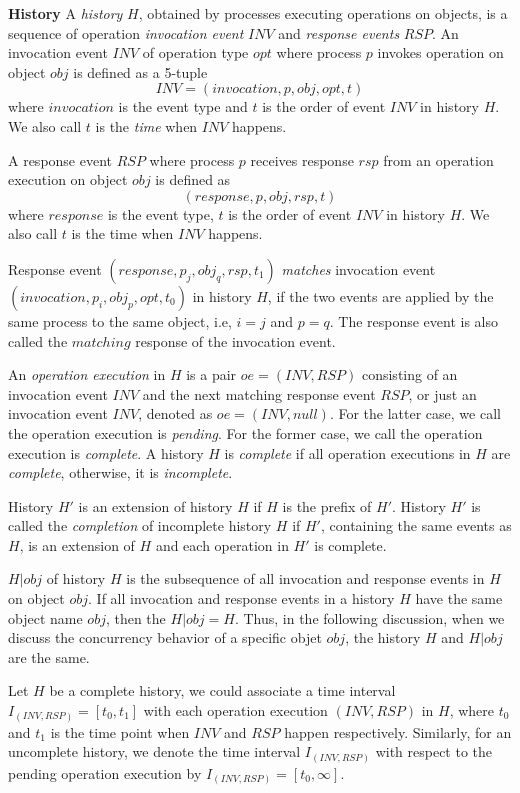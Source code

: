 \textbf{History}
A \emph{history} $H$, obtained by processes executing
operations on objects, is a sequence of operation \emph{invocation event} $INV$
and \emph{response events} $RSP$.
An invocation event $INV$ of operation type $opt$ where process $p$ invokes operation on object
$obj$ is defined as a 5-tuple
$$INV = (invocation, p, obj, opt, t)$$
where $invocation$ is the event type and
$t$ is the order of event $INV$ in history $H$. We also call $t$ is the \emph{time} when $INV$ happens.

A response event $RSP$ where process $p$ receives response $rsp$ from an operation execution on object $obj$
is defined as
$$(response, p, obj, rsp, t)$$
where $response$ is the event type, $t$ is the order of event $INV$
in history $H$. We also call $t$ is the time when $INV$ happens.

Response event $(response, p_j, obj_q, rsp, t_1)$ \emph{matches} invocation event $(invocation, p_i, obj_p, opt, t_0)$
in history $H$, if the two events are applied by the same process to the same object, i.e, $i = j$ and $p = q$.
The response event is also called the $matching$ response of the invocation event.

An \emph{operation execution} in $H$ is a pair $oe = (INV, RSP)$ consisting of an invocation event $INV$
and the next matching response event $RSP$, or just an invocation event $INV$, denoted as $oe = (INV, null)$.
For the latter case, we call the operation execution is \emph{pending}. For the former case, we call the operation
execution is \emph{complete}. A history $H$ is \emph{complete} if all operation executions in $H$ are \emph{complete},
otherwise, it is \emph{incomplete}.

History $H'$ is an extension of history $H$ if $H$ is the prefix of $H'$.
History $H'$ is called the \emph{completion} of incomplete history $H$ if $H'$, containing the same
events as $H$, is an extension of $H$ and each operation in $H'$ is complete.

$H|obj$ of history $H$ is the subsequence of all
invocation and response events in $H$ on object $obj$. If all invocation and response
events in a history $H$ have the same object name $obj$, then the $H|obj = H$. Thus, in the following discussion,
when we discuss the concurrency behavior of a specific objet $obj$, the history $H$ and $H|obj$ are the same.

Let $H$ be a complete history, we could associate a time interval $I_{(INV, RSP)} = [t_0, t_1]$ with each
operation execution $(INV, RSP)$ in $H$, where $t_0$ and $t_1$ is the time point when $INV$ and $RSP$ happen
respectively. Similarly, for an uncomplete history, we denote the time interval $I_{(INV, RSP)}$ with respect to the pending
operation execution by $I_{(INV, RSP)} = [t_0, \infty]$.

